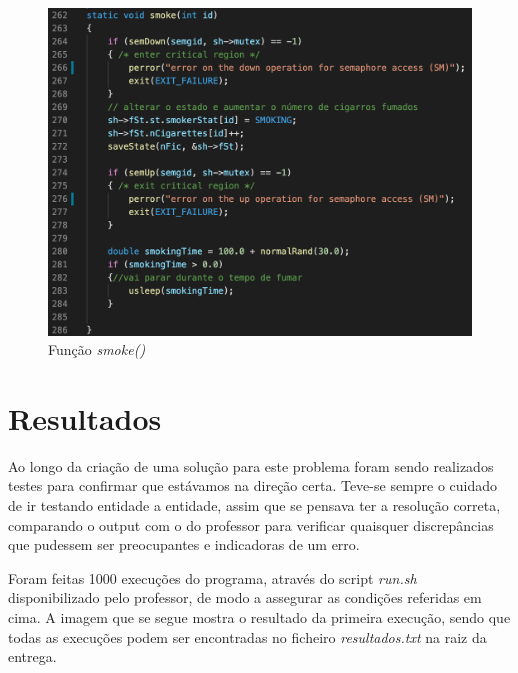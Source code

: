 \documentclass[10pt,portuguese]{article}
\begin{document}
\begin{figure}[!h]
    \centering
    \includegraphics[width=\textwidth]{images/implementation/smoke.png}
    \caption{Função \textit{smoke()}}
\end{figure}



\clearpage

\section{Resultados}
\par Ao longo da criação de uma solução para este problema foram sendo realizados testes para confirmar que estávamos na direção certa. Teve-se sempre o cuidado de ir testando entidade a entidade, assim que se pensava ter a resolução correta, comparando o output com o do professor para verificar quaisquer discrepâncias que pudessem ser preocupantes e indicadoras de um erro.

\par Foram feitas 1000 execuções do programa, através do script \textit{run.sh} disponibilizado pelo professor, de modo a assegurar as condições referidas em cima. A imagem que se segue mostra o resultado da primeira execução, sendo que todas as execuções podem ser encontradas no ficheiro \textit{resultados.txt} na raiz da entrega.
\end{document}
